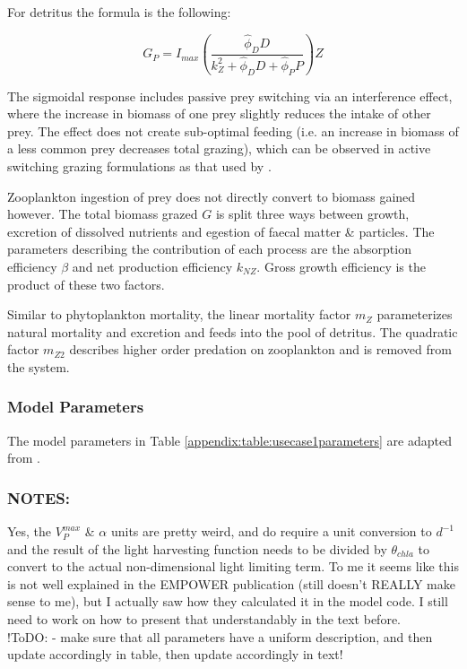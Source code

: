 \documentclass[template.tex]{subfiles}
\begin{document}
For detritus the formula is the following:

\begin{equation}
    G_P = I_{max} \left( \frac{ \hat{\phi}_D D}{k_Z^2 + \hat{\phi}_D D +\hat{\phi}_P P}  \right) Z
\end{equation}

The sigmoidal response includes passive prey switching via an interference effect, where the increase in biomass of one prey slightly reduces the intake of other prey. The effect does not create sub-optimal feeding (i.e. an increase in biomass of a less common prey decreases total grazing), which can be observed in active switching grazing formulations as that used by \citet{Fasham1990a}.

Zooplankton ingestion of prey does not directly convert to biomass gained however. The total biomass grazed $G$ is split three ways between growth, excretion of dissolved nutrients and egestion of faecal matter \& particles. The parameters describing the contribution of each process are the absorption efficiency $\beta$ and net production efficiency $k_{NZ}$. Gross growth efficiency is the product of these two factors.  

Similar to phytoplankton mortality, the linear mortality factor $m_Z$ parameterizes natural mortality and excretion and feeds into the pool of detritus. The quadratic factor $m_{Z2}$ describes higher order predation on zooplankton and is removed from the system.



\subsubsection{Model Parameters}
The model parameters in Table \ref{appendix:table:usecase1parameters} are adapted from \citet{Anderson2015c}.


\subsubsection{NOTES:}
Yes, the $V^{max}_P$ \& $\alpha$  units are pretty weird, and do require a unit conversion to $d^{-1}$ and the result of the light harvesting function needs to be divided by $\theta_{chla}$ to convert to the actual non-dimensional light limiting term. To me it seems like this is not well explained in the EMPOWER publication (still doesn't REALLY make sense to me), but I actually saw how they calculated it in the model code. I still need to work on how to present that understandably in the text before. 
\\ !ToDO: 
- make sure that all parameters have a uniform description, and then update accordingly in table, then update accordingly in text! \\
\end{document}

